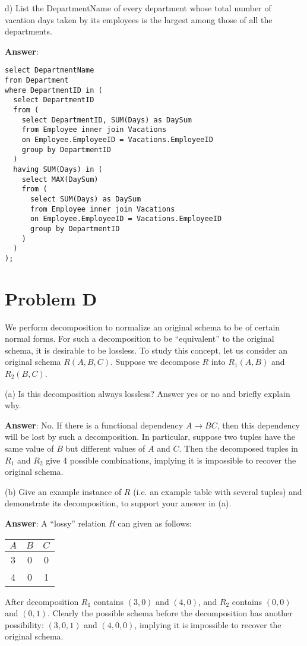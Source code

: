 \documentclass{article}
\begin{document}
d) List the DepartmentName of every department whose total number of vacation days taken by its employees is the largest among those of all the departments.

{\bf Answer}:
\begin{verbatim}
select DepartmentName
from Department
where DepartmentID in (
  select DepartmentID
  from (
    select DepartmentID, SUM(Days) as DaySum
    from Employee inner join Vacations
    on Employee.EmployeeID = Vacations.EmployeeID
    group by DepartmentID
  )
  having SUM(Days) in (
    select MAX(DaySum)
    from (
      select SUM(Days) as DaySum
      from Employee inner join Vacations
      on Employee.EmployeeID = Vacations.EmployeeID
      group by DepartmentID
    )
  )
);
\end{verbatim}

\section{Problem D}
We perform decomposition to normalize an original schema to be of certain normal forms. For such a decomposition to be ``equivalent'' to the original schema, it is desirable to be lossless. To study this concept, let us consider an original schema $R(A, B, C)$. Suppose we decompose $R$ into $R_1 (A, B)$ and $R_2 (B, C)$.

(a) Is this decomposition always lossless? Answer yes or no and briefly explain why.

{\bf Answer}: No. If there is a functional dependency $A \to BC$, then this dependency will be lost by such a decomposition. In particular, suppose two tuples have the same value of $B$ but different values of $A$ and $C$. Then the decomposed tuples in $R_1$ and $R_2$ give 4 possible combinations, implying it is impossible to recover the original schema.

(b) Give an example instance of $R$ (i.e. an example table with several tuples) and demonstrate its decomposition, to support your answer in (a).

{\bf Answer}: A ``lossy'' relation $R$ can given as follows:

\begin{tabular}{c c c}
$A$ & $B$ & $C$ \\
\hline
3 & 0 & 0 \\
4 & 0 & 1 \\
\end{tabular}

After decomposition $R_1$ contains $(3, 0)$ and $(4, 0)$, and $R_2$ contains $(0, 0)$ and $(0, 1)$.
Clearly the possible schema before the decomposition has another possibility: $(3, 0, 1)$ and $(4, 0, 0)$, implying it is impossible to recover the original schema.
\end{document}
